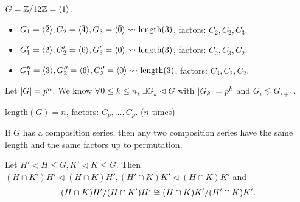 \begin{example}
  $G = {\mathbb{Z}}/{12\mathbb{Z}} = \langle\bar{1}\rangle$.
  \begin{itemize}
    \item $G_1 = \langle\bar{2}\rangle, G_2 = \langle\bar{4}\rangle, G_3 = \langle\bar{0}\rangle
      \leadsto \text{length}(3)$, factors: $C_2, C_2, C_3$.
    \item $G_1' = \langle\bar{2}\rangle, G_2' = \langle\bar{6}\rangle, G_3' = \langle\bar{0}\rangle
      \leadsto \text{length}(3)$, factors: $C_2, C_3, C_2$.
    \item $G_1'' = \langle\bar{3}\rangle, G_2'' = \langle\bar{6}\rangle, G_3'' = \langle\bar{0}\rangle
      \leadsto \text{length}(3)$, factors: $C_3, C_2, C_2$.
  \end{itemize}
\end{example}

\begin{example}
  Let $\lvert G\rvert = p^n$. We know $\forall 0 \le k \le n$, $\exists G_k \lhd G$
  with $\lvert G_k\rvert = p^k$ and $G_i \lneq G_{i+1}$.

  $\text{length}(G) = n$, factors: $C_p, \dots, C_p$. ($n$ times)
\end{example}

\begin{theorem}
  If $G$ has a composition series, then any two composition series have the
  same length and the same factors up to permutation.
\end{theorem}

\begin{lemma}
  Let $H' \lhd H \le G, K' \lhd K \le G$. Then 
  $(H\cap K')H' \lhd (H\cap K)H', (H'\cap K)K' \lhd (H\cap K)K'$ and
  \[
    {(H\cap K)H'}/{(H\cap K')H'} \cong {(H\cap K)K'}/{(H'\cap K)K'}.
  \]
\end{lemma}

